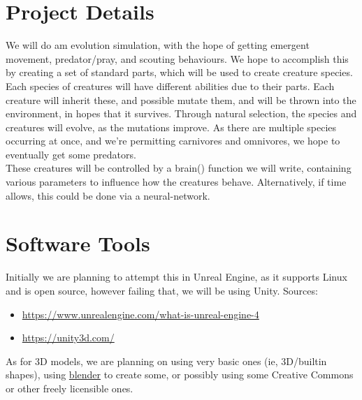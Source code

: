 \documentclass[runningheads]{llncs}
\begin{document}
\section{Project Details}
We will do am evolution simulation, with the hope of getting emergent movement, predator/pray, and scouting behaviours. We hope to accomplish this by creating a set of standard parts, which will be used to create creature species. Each species of creatures will have different abilities due to their parts. Each creature will inherit these, and possible mutate them, and will be thrown into the environment, in hopes that it survives. Through natural selection, the species and creatures will evolve, as the mutations improve. As there are multiple species occurring at once, and we're permitting carnivores and omnivores, we hope to eventually get some predators.\\
These creatures will be controlled by a brain() function we will write, containing various parameters to influence how the creatures behave. Alternatively, if time allows, this could be done via a neural-network.
%
\section{Software Tools}
Initially we are planning to attempt this in Unreal Engine, as it supports Linux and is open source, however failing that, we will be using Unity.
Sources:
\begin{itemize}
\item \url{https://www.unrealengine.com/what-is-unreal-engine-4}
\item \url{https://unity3d.com/}
\end{itemize}
As for 3D models, we are planning on using very basic ones (ie, 3D/builtin shapes), using \href{https://www.blender.org/}{blender} to create some, or possibly using some Creative Commons or other freely licensible ones.
%
\end{document}
